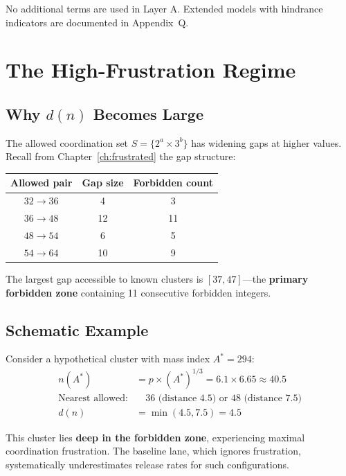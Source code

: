 No additional terms are used in Layer A. Extended models with hindrance
indicators are documented in Appendix~Q.

\section{The High-Frustration Regime}
\label{sec:sh:regime}

\subsection{Why $d(n)$ Becomes Large}

The allowed coordination set $S = \{2^a \times 3^b\}$ has widening gaps at
higher values. Recall from Chapter~\ref{ch:frustrated} the gap structure:

\begin{center}
\begin{tabular}{ccc}
    \toprule
    Allowed pair & Gap size & Forbidden count \\
    \midrule
    $32 \to 36$ & 4 & 3 \\
    $36 \to 48$ & 12 & 11 \\
    $48 \to 54$ & 6 & 5 \\
    $54 \to 64$ & 10 & 9 \\
    \bottomrule
\end{tabular}
\end{center}

The largest gap accessible to known clusters is $[37, 47]$---the
\textbf{primary forbidden zone} containing 11 consecutive forbidden integers.

\subsection{Schematic Example}

Consider a hypothetical cluster with mass index $A^* = 294$:
\begin{align}
    n(A^*) &= p \times (A^*)^{1/3} = 6.1 \times 6.65 \approx 40.5 \\
    \text{Nearest allowed:} &\quad 36 \text{ (distance 4.5) or } 48 \text{ (distance 7.5)} \\
    d(n) &= \min(4.5, 7.5) = 4.5
\end{align}

This cluster lies \textbf{deep in the forbidden zone}, experiencing maximal
coordination frustration. The baseline lane, which ignores frustration,
systematically underestimates release rates for such configurations. \tagP

